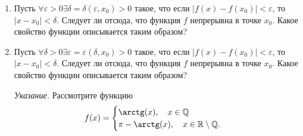 \documentclass[12pt]{article}
\begin{document}
\begin{enumerate}
		\item Пусть $\forall\varepsilon>0$\quad $\exists\delta=\delta(\varepsilon,x_0)>0$ такое, что если $|f(x)-f(x_0)|<\varepsilon$, то $|x-x_0|<\delta$. Следует ли отсюда, что функция $f$ непрерывна в точке $x_0$. Какое свойство функции описывается таким образом?
		
		\item Пусть $\forall\delta>0$\quad $\exists\varepsilon=\varepsilon(\delta,x_0)>0$ такое, что если $|f(x)-f(x_0)|<\varepsilon$, то $|x-x_0|<\delta$. Следует ли отсюда, что функция $f$ непрерывна в точке $x_0$. Какое свойство функции описывается таким образом?
		
		\textit{Указание.} Рассмотрите функцию
		$$
		f(x)=
		\begin{cases}
			\arctg(x),\quad x\in\mathbb{Q}\\
			\pi-\arctg(x),\quad x\in\mathbb{R}\setminus\mathbb{Q}.
		\end{cases}
		$$
	\end{enumerate}
\end{document}
